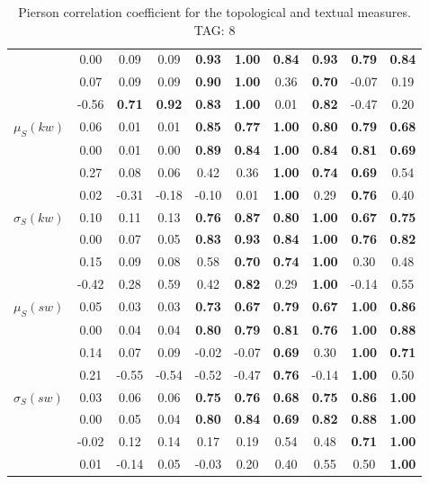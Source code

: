 \begin{table*}[h!]
\begin{center}
\begin{tabular}{| l || c | c | c | c | c | c | c | c | c |}
 & 0.00 & 0.09 & 0.09 & {\bf 0.93} & {\bf 1.00} & {\bf 0.84} & {\bf 0.93} & {\bf 0.79} & {\bf 0.84} \\
 & 0.07 & 0.09 & 0.09 & {\bf 0.90} & {\bf 1.00} & 0.36 & {\bf 0.70} & -0.07 & 0.19 \\
 & -0.56 & {\bf 0.71} & {\bf 0.92} & {\bf 0.83} & {\bf 1.00} & 0.01 & {\bf 0.82} & -0.47 & 0.20 \\\hline
$\mu_S(kw)$ & 0.06 & 0.01 & 0.01 & {\bf 0.85} & {\bf 0.77} & {\bf 1.00} & {\bf 0.80} & {\bf 0.79} & {\bf 0.68} \\
 & 0.00 & 0.01 & 0.00 & {\bf 0.89} & {\bf 0.84} & {\bf 1.00} & {\bf 0.84} & {\bf 0.81} & {\bf 0.69} \\
 & 0.27 & 0.08 & 0.06 & 0.42 & 0.36 & {\bf 1.00} & {\bf 0.74} & {\bf 0.69} & 0.54 \\
 & 0.02 & -0.31 & -0.18 & -0.10 & 0.01 & {\bf 1.00} & 0.29 & {\bf 0.76} & 0.40 \\\hline
$\sigma_S(kw)$ & 0.10 & 0.11 & 0.13 & {\bf 0.76} & {\bf 0.87} & {\bf 0.80} & {\bf 1.00} & {\bf 0.67} & {\bf 0.75} \\
 & 0.00 & 0.07 & 0.05 & {\bf 0.83} & {\bf 0.93} & {\bf 0.84} & {\bf 1.00} & {\bf 0.76} & {\bf 0.82} \\
 & 0.15 & 0.09 & 0.08 & 0.58 & {\bf 0.70} & {\bf 0.74} & {\bf 1.00} & 0.30 & 0.48 \\
 & -0.42 & 0.28 & 0.59 & 0.42 & {\bf 0.82} & 0.29 & {\bf 1.00} & -0.14 & 0.55 \\\hline
$\mu_S(sw)$ & 0.05 & 0.03 & 0.03 & {\bf 0.73} & {\bf 0.67} & {\bf 0.79} & {\bf 0.67} & {\bf 1.00} & {\bf 0.86} \\
 & 0.00 & 0.04 & 0.04 & {\bf 0.80} & {\bf 0.79} & {\bf 0.81} & {\bf 0.76} & {\bf 1.00} & {\bf 0.88} \\
 & 0.14 & 0.07 & 0.09 & -0.02 & -0.07 & {\bf 0.69} & 0.30 & {\bf 1.00} & {\bf 0.71} \\
 & 0.21 & -0.55 & -0.54 & -0.52 & -0.47 & {\bf 0.76} & -0.14 & {\bf 1.00} & 0.50 \\\hline
$\sigma_S(sw)$ & 0.03 & 0.06 & 0.06 & {\bf 0.75} & {\bf 0.76} & {\bf 0.68} & {\bf 0.75} & {\bf 0.86} & {\bf 1.00} \\
 & 0.00 & 0.05 & 0.04 & {\bf 0.80} & {\bf 0.84} & {\bf 0.69} & {\bf 0.82} & {\bf 0.88} & {\bf 1.00} \\
 & -0.02 & 0.12 & 0.14 & 0.17 & 0.19 & 0.54 & 0.48 & {\bf 0.71} & {\bf 1.00} \\
 & 0.01 & -0.14 & 0.05 & -0.03 & 0.20 & 0.40 & 0.55 & 0.50 & {\bf 1.00} \\\hline
\end{tabular}
\caption{Pierson correlation coefficient for the topological and textual measures. TAG: 8}
\end{center}
\end{table*}